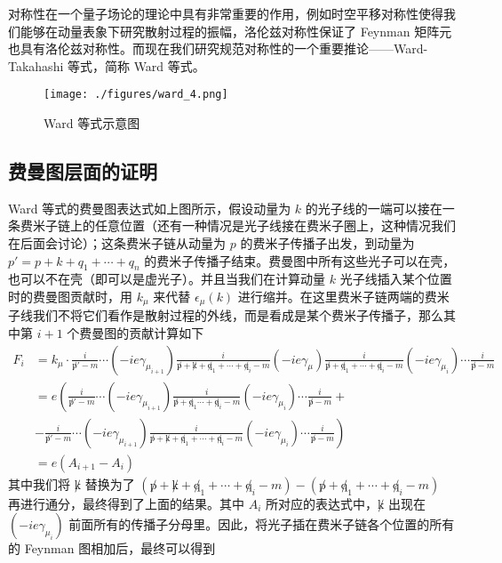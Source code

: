 
对称性在一个量子场论的理论中具有非常重要的作用，例如时空平移对称性使得我们能够在动量表象下研究散射过程的振幅，洛伦兹对称性保证了 Feynman 矩阵元也具有洛伦兹对称性。而现在我们研究规范对称性的一个重要推论——Ward-Takahashi 等式，简称 Ward 等式。

\begin{figure}[ht]
\centering
\texttt{[image: ./figures/ward\_4.png]}
\caption{Ward 等式示意图} \label{ward_fig4}
\end{figure}

\subsection{费曼图层面的证明}
Ward 等式的费曼图表达式如上图所示，假设动量为 $k$ 的光子线的一端可以接在一条费米子链上的任意位置（还有一种情况是光子线接在费米子圈上，这种情况我们在后面会讨论）；这条费米子链从动量为 $p$ 的费米子传播子出发，到动量为 $p'=p+k+q_1+\cdots+q_n$ 的费米子传播子结束。费曼图中所有这些光子可以在壳，也可以不在壳（即可以是虚光子）。并且当我们在计算动量 $k$ 光子线插入某个位置时的费曼图贡献时，用 $k_\mu$ 来代替 $\epsilon_\mu(k)$ 进行缩并。在这里费米子链两端的费米子线我们不将它们看作是散射过程的外线，而是看成是某个费米子传播子，那么其中第 $i+1$ 个费曼图的贡献计算如下
\begin{equation}
\begin{aligned}
F_i&=k_\mu\cdot \frac{i}{\not p'-m}\cdots (-ie\gamma_{\mu_{i+1}})\frac{i}{\not p+\not k+\not q_1+\cdots+\not q_i-m}
(-ie\gamma_\mu)
\frac{i}{\not p+\not q_1+\cdots+\not q_i - m}(-ie\gamma_{\mu_i})\cdots \frac{i}{\not p - m}
\\
&=
e\left(\frac{i}{\not p'-m}\cdots(-ie\gamma_{\mu_{i+1}})\frac{i}{\not p+\not q_1\cdots + \not q_i - m}(-ie\gamma_{\mu_i})\cdots \frac{i}{\not p-m}+\right.\\
&-\left.\frac{i}{\not p'-m}\cdots(-ie\gamma_{\mu_{i+1}})\frac{i}{\not p+\not k+\not q_1+\cdots + \not q_i-m}(-ie\gamma_{\mu_i}) \cdots \frac{i}{\not p-m}\right)
\\
&=e(A_{i+1}-A_i)
\end{aligned}
\end{equation}
其中我们将 $\not k$ 替换为了 $(\not p+\not k+\not q_1+\cdots + \not q_i-m) - (\not p+\not q_1+\cdots + \not q_i-m)$ 再进行通分，最终得到了上面的结果。其中 $A_i$ 所对应的表达式中，$\not k$ 出现在 $(-ie\gamma_{\mu_{i}})$ 前面所有的传播子分母里。因此，将光子插在费米子链各个位置的所有的 Feynman 图相加后，最终可以得到
